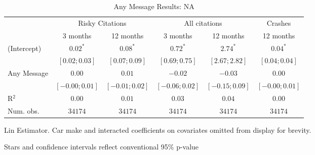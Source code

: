 
\begin{table}
\caption{Any Message Results: NA}
\begin{center}
\begin{threeparttable}
\begin{tabular}{l c c c c c}
\hline
 & \multicolumn{2}{c}{Risky Citations} & \multicolumn{2}{c}{All citations} & \multicolumn{1}{c}{Crashes} \\
\cline{2-3} \cline{4-5} \cline{6-6}
 & 3 months & 12 months & 3 months & 12 months & 12 months \\
\hline
(Intercept) & $0.02^{*}$       & $0.08^{*}$       & $0.72^{*}$       & $2.74^{*}$       & $0.04^{*}$       \\
            & $ [ 0.02; 0.03]$ & $ [ 0.07; 0.09]$ & $ [ 0.69; 0.75]$ & $ [ 2.67; 2.82]$ & $ [ 0.04; 0.04]$ \\
Any Message & $0.00$           & $0.01$           & $-0.02$          & $-0.03$          & $0.00$           \\
            & $ [-0.00; 0.01]$ & $ [-0.01; 0.02]$ & $ [-0.06; 0.02]$ & $ [-0.15; 0.09]$ & $ [-0.00; 0.01]$ \\
\hline
R$^2$       & $0.00$           & $0.01$           & $0.03$           & $0.04$           & $0.00$           \\
Num. obs.   & $34174$          & $34174$          & $34174$          & $34174$          & $34174$          \\
\hline
\end{tabular}
\begin{tablenotes}[flushleft]
\scriptsize{\item Lin Estimator. Car make and interacted coefficients on covariates omitted from display for brevity.
                             \item Stars and confidence intervals reflect conventional 95\% p-value}
\end{tablenotes}
\end{threeparttable}
\label{table:coefficients}
\end{center}
\end{table}
